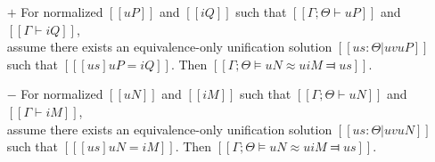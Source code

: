 \begin{lemma} \label{lemma:unification-completeness}
    \hfill
    \begin{itemize}
        \item [$+$] For normalized $[[uP]]$ and $[[iQ]]$ such that
        $[[Γ ; Θ ⊢ uP]]$ and $[[Γ ⊢ iQ]]$,\\ 
        assume there exists an equivalence-only unification solution
        $[[us : Θ | uv uP]]$ such that $[[ [us]uP = iQ ]]$.
        Then $[[Γ ; Θ ⊨ uN ≈u iM ⫤ us]]$.
        
        \item [$-$] For normalized $[[uN]]$ and $[[iM]]$ such that
        $[[Γ ; Θ ⊢ uN]]$ and $[[Γ ⊢ iM]]$,\\
        assume there exists an equivalence-only unification solution
        $[[us : Θ | uv uN]]$        
        such that $[[ [us]uN = iM ]]$.
        Then $[[Γ ; Θ ⊨ uN ≈u iM ⫤ us]]$.
   \end{itemize}
\end{lemma}
